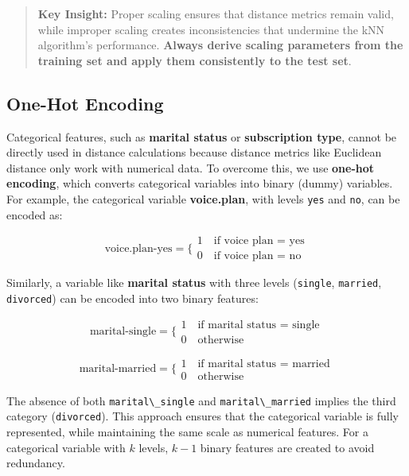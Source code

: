 \documentclass[
]{book}
\newcommand{\passthrough}[1]{#1}
\theoremstyle{definition}
\theoremstyle{definition}
\theoremstyle{definition}
\theoremstyle{definition}
\theoremstyle{remark}
\begin{document}
\begin{quote}
\textbf{Key Insight:} Proper scaling ensures that distance metrics remain valid, while improper scaling creates inconsistencies that undermine the kNN algorithm's performance. \textbf{Always derive scaling parameters from the training set and apply them consistently to the test set}.
\end{quote}

\subsection{One-Hot Encoding}\label{one-hot-encoding-1}

Categorical features, such as \textbf{marital status} or \textbf{subscription type}, cannot be directly used in distance calculations because distance metrics like Euclidean distance only work with numerical data. To overcome this, we use \textbf{one-hot encoding}, which converts categorical variables into binary (dummy) variables. For example, the categorical variable \textbf{voice.plan}, with levels \passthrough{\lstinline!yes!} and \passthrough{\lstinline!no!}, can be encoded as:

\[
\text{voice.plan-yes} = 
\bigg\{
\begin{matrix}
1 \quad \text{if voice plan = yes}  \\
0 \quad \text{if voice plan = no} 
\end{matrix}
\]

Similarly, a variable like \textbf{marital status} with three levels (\passthrough{\lstinline!single!}, \passthrough{\lstinline!married!}, \passthrough{\lstinline!divorced!}) can be encoded into two binary features:

\[
\text{marital-single} = 
\bigg\{
\begin{matrix}
1 \quad \text{if marital status = single}  \\
0 \quad \text{otherwise}
\end{matrix}
\]

\[
\text{marital-married} = 
\bigg\{
\begin{matrix}
1 \quad \text{if marital status = married}  \\
0 \quad \text{otherwise}
\end{matrix}
\]

The absence of both \passthrough{\lstinline!marital\_single!} and \passthrough{\lstinline!marital\_married!} implies the third category (\passthrough{\lstinline!divorced!}). This approach ensures that the categorical variable is fully represented, while maintaining the same scale as numerical features. For a categorical variable with \(k\) levels, \(k-1\) binary features are created to avoid redundancy.
\end{document}
